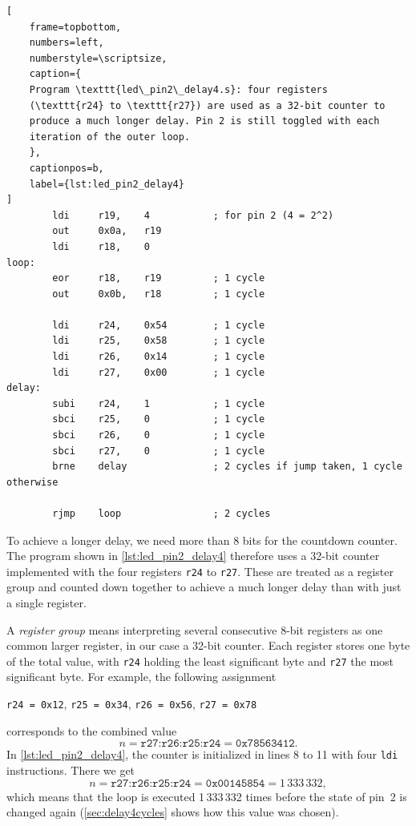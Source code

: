 \documentclass[a4paper,12pt]{article}
\begin{document}
\begin{listing}[htbp]
\begin{lstlisting}[
    frame=topbottom,
    numbers=left,
    numberstyle=\scriptsize,
    caption={
	Program \texttt{led\_pin2\_delay4.s}: four registers
	(\texttt{r24} to \texttt{r27}) are used as a 32-bit counter to
	produce a much longer delay. Pin 2 is still toggled with each
	iteration of the outer loop.
    },
    captionpos=b,
    label={lst:led_pin2_delay4}
]
        ldi     r19,    4           ; for pin 2 (4 = 2^2)
        out     0x0a,   r19
        ldi     r18,    0
loop:
        eor     r18,    r19         ; 1 cycle
        out     0x0b,   r18         ; 1 cycle

        ldi     r24,    0x54        ; 1 cycle
        ldi     r25,    0x58        ; 1 cycle
        ldi     r26,    0x14        ; 1 cycle
        ldi     r27,    0x00        ; 1 cycle
delay:
        subi    r24,    1           ; 1 cycle
        sbci    r25,    0           ; 1 cycle
        sbci    r26,    0           ; 1 cycle
        sbci    r27,    0           ; 1 cycle
        brne    delay               ; 2 cycles if jump taken, 1 cycle otherwise

        rjmp    loop                ; 2 cycles
\end{lstlisting}
\end{listing}


\noindent
To achieve a longer delay, we need more than 8 bits for the countdown
counter. The program shown in \autoref{lst:led_pin2_delay4} therefore uses a
32-bit counter implemented with the four registers \texttt{r24} to
\texttt{r27}. These are treated as a register group and counted down
together to achieve a much longer delay than with just a single register.

A \emph{register group} means interpreting several consecutive 8-bit
registers as one common larger register, in our case a 32-bit counter. Each
register stores one byte of the total value, with \texttt{r24} holding the
least significant byte and \texttt{r27} the most significant byte. For
example, the following assignment

\begin{center}
    \texttt{r24 = 0x12}, \quad \texttt{r25 = 0x34},
    \quad \texttt{r26 = 0x56}, \quad \texttt{r27 = 0x78}
\end{center}

\noindent
corresponds to the combined value
\[
    n = \texttt{r27:r26:r25:r24} = \texttt{0x78563412}.
\]
In \autoref{lst:led_pin2_delay4}, the counter is initialized in lines 8 to 11
with four \texttt{ldi} instructions. There we get
\[
    n = \texttt{r27:r26:r25:r24} = \texttt{0x00145854} = 1\,333\,332,
\]
which means that the loop is executed 1\,333\,332 times before the state of
pin~2 is changed again (\autoref{sec:delay4cycles} shows how this value was
chosen).
\end{document}
